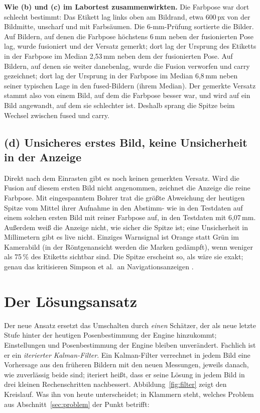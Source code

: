 \documentclass[11pt,a4paper,fleqn]{article}
\begin{document}
\textbf{Wie (b) und (c) im Labortest zusammenwirkten.} Die Farbpose war dort schlecht bestimmt: Das Etikett lag
links oben am Bildrand, etwa 600\,px von der Bildmitte, unscharf und mit Farbsäumen. Die 6-mm-Prüfung sortierte
die Bilder. Auf Bildern, auf denen die Farbpose höchstens 6\,mm neben der fusionierten Pose lag, wurde fusioniert
und der Versatz gemerkt; dort lag der Ursprung des Etiketts in der Farbpose im Median 2,53\,mm neben dem der
fusionierten Pose. Auf Bildern, auf denen sie weiter danebenlag, wurde die Fusion verworfen und carry gezeichnet;
dort lag der Ursprung in der Farbpose im Median 6,8\,mm neben seiner typischen Lage in den fused-Bildern (ihrem
Median). Der gemerkte Versatz stammt also von einem Bild, auf dem die Farbpose besser war, und wird auf ein Bild
angewandt, auf dem sie schlechter ist. Deshalb sprang die Spitze beim Wechsel zwischen fused und carry.

\subsection*{(d) Unsicheres erstes Bild, keine Unsicherheit in der Anzeige}

Direkt nach dem Einrasten gibt es noch keinen gemerkten Versatz. Wird die Fusion auf diesem ersten Bild nicht
angenommen, zeichnet die Anzeige die reine Farbpose. Mit eingespanntem Bohrer trat die größte Abweichung der
heutigen Spitze vom Mittel ihrer Aufnahme in den Abstimm- wie in den Testdaten auf einem solchen ersten Bild mit
reiner Farbpose auf, in den Testdaten mit 6,07\,mm. Außerdem weiß die Anzeige nicht, wie sicher die Spitze ist;
eine Unsicherheit in Millimetern gibt es live nicht. Einziges Warnsignal ist Orange statt Grün im Kamerabild (in
der Röntgenansicht werden die Marken gedämpft), wenn weniger als 75\,\% des Etiketts sichtbar sind. Die Spitze
erscheint so, als wäre sie exakt; genau das kritisieren Simpson et al.\ an Navigationsanzeigen
\cite{simpson2014computation}.

\section{Der Lösungsansatz}
\label{sec:neu}

Der neue Ansatz ersetzt das Umschalten durch \emph{einen} Schätzer, der als neue letzte Stufe hinter der heutigen
Posenbestimmung der Engine hinzukommt; Einstellungen und Posenbestimmung der Engine bleiben unverändert. Fachlich
ist er ein \emph{iterierter Kalman-Filter}. Ein Kalman-Filter verrechnet in jedem Bild eine Vorhersage aus den
früheren Bildern mit den neuen Messungen, jeweils danach, wie zuverlässig beide sind; \glqq iteriert\grqq{} heißt,
dass er seine Lösung in jedem Bild in drei kleinen Rechenschritten nachbessert. Abbildung~\ref{fig:filter} zeigt
den Kreislauf. Was ihn von heute unterscheidet; in Klammern steht, welches Problem aus Abschnitt~\ref{sec:problem}
der Punkt betrifft:
\end{document}

